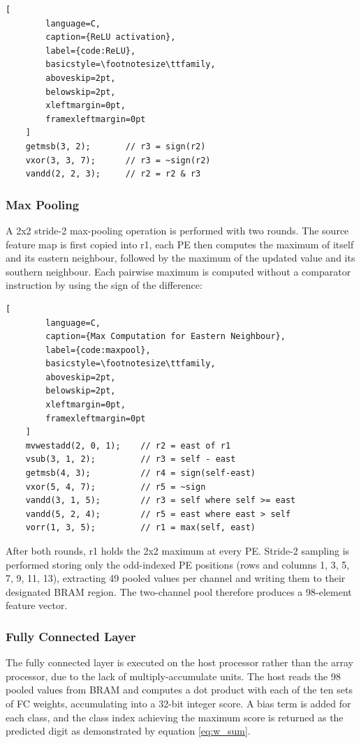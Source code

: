     \begin{lstlisting}[
        language=C,
        caption={ReLU activation},
        label={code:ReLU},
        basicstyle=\footnotesize\ttfamily,
        aboveskip=2pt,
        belowskip=2pt,
        xleftmargin=0pt,
        framexleftmargin=0pt
    ]
    getmsb(3, 2);       // r3 = sign(r2)
    vxor(3, 3, 7);      // r3 = ~sign(r2)
    vandd(2, 2, 3);     // r2 = r2 & r3 \end{lstlisting}


        
        \subsubsection{Max Pooling}
        A 2x2 stride-2 max-pooling operation is performed with two rounds. The source feature map is first copied into r1, each PE then computes the maximum of itself and its eastern neighbour, followed by the maximum of the updated value and its southern neighbour. Each pairwise maximum is computed without a comparator instruction by using the sign of the difference:

    \begin{lstlisting}[
        language=C,
        caption={Max Computation for Eastern Neighbour},
        label={code:maxpool},
        basicstyle=\footnotesize\ttfamily,
        aboveskip=2pt,
        belowskip=2pt,
        xleftmargin=0pt,
        framexleftmargin=0pt
    ]
    mvwestadd(2, 0, 1);    // r2 = east of r1
    vsub(3, 1, 2);         // r3 = self - east
    getmsb(4, 3);          // r4 = sign(self-east)
    vxor(5, 4, 7);         // r5 = ~sign
    vandd(3, 1, 5);        // r3 = self where self >= east
    vandd(5, 2, 4);        // r5 = east where east > self
    vorr(1, 3, 5);         // r1 = max(self, east) \end{lstlisting}
        
        After both rounds, r1 holds the 2x2 maximum at every PE. Stride-2 sampling is performed storing only the odd-indexed PE positions (rows and columns 1, 3, 5, 7, 9, 11, 13), extracting 49 pooled values per channel and writing them to their designated BRAM region. The two-channel pool therefore produces a 98-element feature vector.
        
        \subsubsection{Fully Connected Layer}
        The fully connected layer is executed on the host processor rather than the array processor, due to the lack of multiply-accumulate units. The host reads the 98 pooled values from BRAM and computes a dot product with each of the ten sets of FC weights, accumulating into a 32-bit integer score. A bias term is added for each class, and the class index achieving the maximum score is returned as the predicted digit as demonstrated by equation \ref{eq:w_sum}.
        
